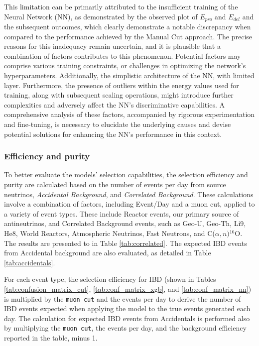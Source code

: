 This limitation can be primarily attributed to the insufficient training of the Neural Network (NN), as demonstrated by the observed plot of $E_{pro}$ and $E_{del}$ and the subsequent outcomes, which clearly demonstrate a notable discrepancy when compared to the performance achieved by the Manual Cut approach. The precise reasons for this inadequacy remain uncertain, and it is plausible that a combination of factors contributes to this phenomenon. Potential factors may comprise various training constraints, or challenges in optimizing the network's hyperparameters. Additionally, the simplistic architecture of the NN, with limited layer. Furthermore, the presence of outliers within the energy values used for training, along with subsequent scaling operations, might introduce further complexities and adversely affect the NN's discriminative capabilities. A comprehensive analysis of these factors, accompanied by rigorous experimentation and fine-tuning, is necessary to elucidate the underlying causes and devise potential solutions for enhancing the NN's performance in this context.
 
\subsubsection{Efficiency and purity}
To better evaluate the models' selection capabilities, the selection efficiency and purity are calculated based on the number of events per day from source neutrinos, \textit{Accidental Background}, and \textit{Correlated Background}. These calculations involve a combination of factors, including Event/Day and a muon cut, applied to a variety of event types. These include Reactor events, our primary source of antineutrinos, and Correlated Background events, such as Geo-U, Geo-Th, Li9, He8, World Reactors, Atmospheric Neutrinos, Fast Neutrons, and $\mathrm{C}$($\alpha,n)$$^{16}\mathrm{O}$. The results are presented to in Table \ref{tab:correlated}. The expected IBD events from Accidental background are also evaluated, as detailed in Table \ref{tab:accidentals}.

For each event type, the selection efficiency for IBD (shown in Tables \ref{tab:confusion_matrix_cut}, \ref{tab:conf_matrix_xgb}, and \ref{tab:conf_matrix_nn}) is multiplied by the \texttt{muon cut} and the events per day to derive the number of IBD events expected when applying the model to the true events generated each day. The calculation for expected IBD events from Accidentals is performed also by multiplying the \texttt{muon cut}, the events per day, and the background efficiency reported in the table, minus 1.


